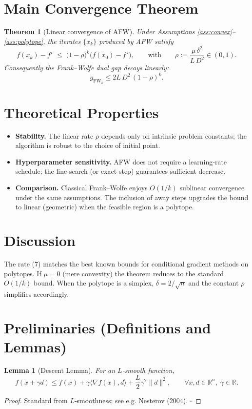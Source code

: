 \documentclass{article}
\newtheorem{theorem}{Theorem}
\newtheorem{lemma}{Lemma}
\newcommand{\gap}{g_{\text{FW}}}
\newcommand{\diam}{D}
\newcommand{\pwidth}{\delta}
\begin{document}
\section*{Main Convergence Theorem}
\begin{theorem}[Linear convergence of AFW]\label{thm:linear}
Under Assumptions \ref{ass:convex}–\ref{ass:polytope}, the iterates $\{x_k\}$ produced by AFW satisfy
\[
f(x_k)-f^\star \;\le\;
\bigl(1-\rho\bigr)^k\bigl(f(x_0)-f^\star\bigr),
\qquad\text{with}\qquad
\rho:=\frac{\mu\,\pwidth^{2}}{L\,\diam^{2}}\in(0,1).
\tag{7}
\]
Consequently the Frank–Wolfe dual gap decays linearly:
\[
\gap_k\le 2L\,\diam^{2}\,(1-\rho)^{k}.
\]
\end{theorem}

\section*{Theoretical Properties}
\begin{itemize}
\item \textbf{Stability.} The linear rate $\rho$ depends only on intrinsic problem constants; the algorithm is robust to the choice of initial point.
\item \textbf{Hyperparameter sensitivity.} AFW does not require a learning‑rate schedule; the line‑search (or exact step) guarantees sufficient decrease.
\item \textbf{Comparison.} Classical Frank–Wolfe enjoys $O(1/k)$ sublinear convergence under the same assumptions. The inclusion of away steps upgrades the bound to linear (geometric) when the feasible region is a polytope.
\end{itemize}

\section*{Discussion}
The rate (7) matches the best known bounds for conditional gradient methods on polytopes.
If $\mu=0$ (mere convexity) the theorem reduces to the standard $O(1/k)$ bound.
When the polytope is a simplex, $\pwidth=2/\sqrt{n}$ and the constant $\rho$ simplifies accordingly.

\newpage
\section*{Preliminaries (Definitions and Lemmas)}

\begin{lemma}[Descent Lemma]\label{lem:descent}
For an $L$‑smooth function,
\[
f(x+\gamma d)\le f(x)+\gamma\langle\nabla f(x),d\rangle+\frac{L}{2}\gamma^{2}\|d\|^{2},
\qquad\forall x,d\in\mathbb{R}^{n},\;\gamma\in\mathbb{R}.
\tag{8}
\]
\end{lemma}
\begin{proof}
Standard from $L$‑smoothness; see e.g. Nesterov (2004). \hfill $\square$
\end{proof}
\end{document}
